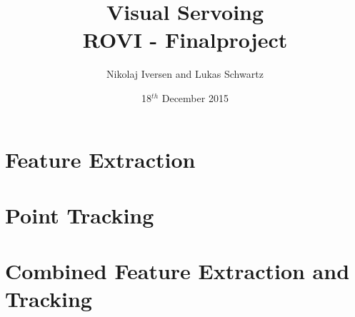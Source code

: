 \documentclass[12pt,a4paper,conference]{IEEEtran}
\begin{document}
\raggedbottom

\title{Visual Servoing\\ \large{ROVI - Finalproject}}
\author{Nikolaj Iversen and Lukas Schwartz}
\date{18$^{th}$ December 2015}

\maketitle


\section{Feature Extraction}






\section{Point Tracking}





\section{Combined Feature Extraction and Tracking}
\label{sec:combinedSystem}



\end{document}
